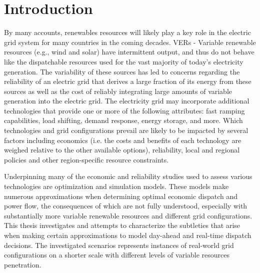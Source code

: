 \documentclass[12pt,LUDisStyle,twosided]{book}
\begin{document}
\pagestyle{plain}
\dissertationtrue



\tableofcontents
\nopagebreak
{}
\listoftables
{}
\listoffigures
\newpage
\pagestyle{plain}

\pagestyle{plain}

\chapter{Introduction}

By many accounts, renewables resources will likely play a key role in the electric grid system for many countries in the coming decades.  VERs - Variable renewable resources (e.g., wind and solar) have intermittent output, and thus do not behave like the dispatchable resources used for the vast majority of today’s electricity generation. The variability of these sources has led to concerns regarding the reliability of an electric grid that derives a large fraction of its energy from these sources as well as the cost of reliably integrating large amounts of variable generation into the electric grid. The electricity grid may incorporate additional technologies that provide one or more of the following attributes: fast ramping capabilities, load shifting, demand response, energy storage, and more.   Which technologies and grid configurations prevail are likely to be impacted by several factors including economics (i.e. the costs and benefits of each technology are weighed relative to the other available options), reliability, local and regional policies and other region-specific resource constraints.

Underpinning many of the economic and reliability studies used to assess various technologies are optimization and simulation models.  These models make numerous approximations when determining optimal economic dispatch and power flow, the consequences of which are not fully understood, especially with substantially more variable renewable resources and different grid configurations.  This thesis investigates and attempts to characterize the subtleties that arise when making certain approximations to model day-ahead and real-time dispatch decisions. The investigated scenarios represents instances of real-world grid configurations on a shorter scale with different levels of variable resources penetration.
\end{document}
